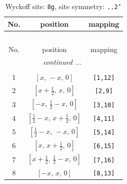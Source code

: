 \documentclass[fleqn,8pt]{jsarticle}
\begin{document}
\renewcommand{\arraystretch}{1.2}
\begin{longtable}{ccc}
\caption{Wyckoff site: {\tt 8g}, site symmetry: {\tt ..2'}}
 \\
 \hline \hline
No. & position & mapping \\ \hline \endfirsthead

\multicolumn{2}{l}{\tablename\ \thetable{}} \\
 \hline \hline
No. & position & mapping \\ \hline \endhead

 \hline \hline
\multicolumn{2}{r}{\footnotesize\it continued ...} \\ \endfoot

 \hline \hline
\multicolumn{2}{r}{} \\ \endlastfoot

1 & $\left[ x,\, - x,\, 0 \right]$ & {\tt [1,12]} \\ \hline
2 & $\left[ x + \frac{1}{2},\, x,\, 0 \right]$ & {\tt [2,9]} \\ \hline
3 & $\left[ - x,\, \frac{1}{2} - x,\, 0 \right]$ & {\tt [3,10]} \\ \hline
4 & $\left[ \frac{1}{2} - x,\, x + \frac{1}{2},\, 0 \right]$ & {\tt [4,11]} \\ \hline
5 & $\left[ \frac{1}{2} - x,\, - x,\, 0 \right]$ & {\tt [5,14]} \\ \hline
6 & $\left[ x,\, x + \frac{1}{2},\, 0 \right]$ & {\tt [6,15]} \\ \hline
7 & $\left[ x + \frac{1}{2},\, \frac{1}{2} - x,\, 0 \right]$ & {\tt [7,16]} \\ \hline
8 & $\left[ - x,\, x,\, 0 \right]$ & {\tt [8,13]} \\
\end{longtable}
\renewcommand{\arraystretch}{1.2}
\end{document}
